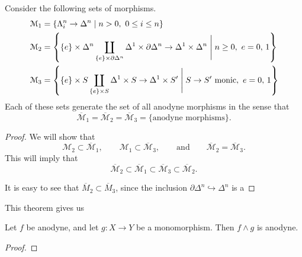 \documentclass[main.tex]{subfiles}
\begin{document}
\begin{theorem}
  \label{thm:saturated_hull_of_various_sets_are_anodyne_morphisms}
  Consider the following sets of morphisms.
  \begin{align*}
    \mathcal{M}_{1} &= \left\{ \Lambda^{n}_{i} \to \Delta^{n} \mid n > 0,\ 0 \leq i \leq n \right\} \\
    \mathcal{M}_{2} &= \left\{ \{e\} \times \Delta^{n} \coprod_{\{e\} \times \partial \Delta^{n}} \Delta^{1} \times \partial\Delta^{n} \to \Delta^{1} \times \Delta^{n} \Biggm| n \geq 0,\ e = 0,\, 1 \right\} \\
    \mathcal{M}_{3} &= \left\{ \{e\} \times S \coprod_{\{e\} \times S} \Delta^{1} \times S \to \Delta^{1} \times S' \Biggm| S \to S'\ \text{monic},\ e = 0,\, 1 \right\}
  \end{align*}
  Each of these sets generate the set of all anodyne morphisms in the sense that
  \begin{equation*}
    \overline{\mathcal{M}}_{1} = \overline{\mathcal{M}}_{2} = \overline{\mathcal{M}}_{3} = \{\text{anodyne morphisms}\}.
  \end{equation*}
\end{theorem}
\begin{proof}
  We will show that
  \begin{equation*}
    \mathcal{M}_{2} \subset \overline{\mathcal{M}}_{1},\qquad \mathcal{M}_{1} \subset \overline{\mathcal{M}}_{3},\qquad \text{and}\qquad \overline{\mathcal{M}}_{2} = \overline{\mathcal{M}}_{3}.
  \end{equation*}
  This will imply that
  \begin{equation*}
    \overline{\mathcal{M}}_{2} \subset \overline{\mathcal{M}}_{1} \subset \overline{\mathcal{M}}_{3} \subset \overline{\mathcal{M}}_{2}.
  \end{equation*}

  It is easy to see that $\overline{M}_{2} \subset \overline{M}_{3}$, since the inclusion $\partial \Delta^{n} \hookrightarrow \Delta^{n}$ is a 
\end{proof}

This theorem gives us 

\begin{corollary}
  Let $f$ be anodyne, and let $g\colon X \to Y$ be a monomorphism. Then $f \wedge g$ is anodyne.
\end{corollary}
\begin{proof}

\end{proof}
\end{document}
